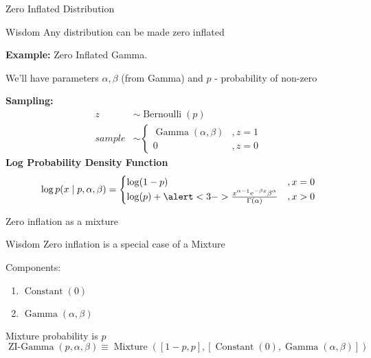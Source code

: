 \documentclass{beamer}
\begin{document}
\begin{frame}{Zero Inflated Distribution}
    \begin{block}{Wisdom}
        Any distribution can be made zero inflated
    \end{block}
    \textbf{Example:} Zero Inflated Gamma.
    
    We'll have parameters $\alpha, \beta$ (from Gamma) and $p$ - probability of non-zero
    
    \textbf{Sampling:}
    \begin{align*}
        z &\sim \operatorname{Bernoulli}(p)\\
        sample &\sim \begin{cases}
        \operatorname{Gamma}(\alpha, \beta)&, z = 1\\
        0&, z =0
        \end{cases}
    \end{align*}
    \pause
    \textbf{Log Probability Density Function}
    \begin{equation*}
        \log p(x\cond p, \alpha, \beta) = \begin{cases}
        \log(1-p) &,x=0\\
        \log(p) + \alert<3->{\frac {x^{\alpha -1}e^{-\beta x}\beta ^{\alpha }}{\Gamma (\alpha )}}
        &,x> 0
        \end{cases}
    \end{equation*}
\end{frame}
\begin{frame}{Zero inflation as a mixture}
    \begin{block}{Wisdom}
        Zero inflation is a special case of a Mixture
    \end{block}
    Components:
    \begin{enumerate}
        \item $\operatorname{Constant}(0)$
        \item $\operatorname{Gamma}(\alpha, \beta)$
    \end{enumerate}
    Mixture probability is $p$
    \begin{equation*}
        \operatorname{ZI-Gamma}(p, \alpha, \beta) \equiv \operatorname{Mixture}([1-p, p], [\operatorname{Constant}(0), \operatorname{Gamma}(\alpha, \beta)])
    \end{equation*}
\end{frame}
\end{document}

